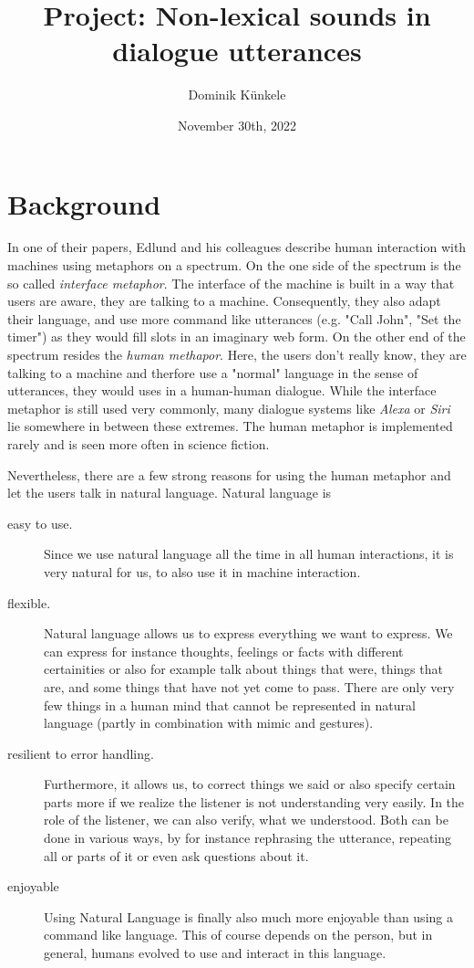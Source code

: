 \documentclass[
	11pt, %
]{fphw}
\title{Project: Non-lexical sounds in dialogue utterances} %
\date{November 30th, 2022} %
\author{Dominik Künkele}
\institute{University of Gothenburg} %
\begin{document}
\maketitle %


\section*{Background}
In one of their papers, Edlund and his colleagues describe human interaction with machines using metaphors on a spectrum. On the one side of the spectrum is the so called \emph{interface metaphor}. The interface of the machine is built in a way that users are aware, they are talking to a machine. Consequently, they also adapt their language, and use more command like utterances (e.g. "Call John", "Set the timer") as they would fill slots in an imaginary web form. On the other end of the spectrum resides the \emph{human methapor}. Here, the users don't really know, they are talking to a machine and therfore use a "normal" language in the sense of utterances, they would uses in a human-human dialogue. While the interface metaphor is still used very commonly, many dialogue systems like \emph{Alexa} or \emph{Siri} lie somewhere in between these extremes. The human metaphor is implemented rarely and is seen more often in science fiction.

Nevertheless, there are a few strong reasons for using the human metaphor and let the users talk in natural language. Natural language is
\begin{description}
    \item[easy to use.] Since we use natural language all the time in all human interactions, it is very natural for us, to also use it in machine interaction.
    \item[flexible.] Natural language allows us to express everything we want to express. We can express for instance thoughts, feelings or facts with different certainities or also for example talk about things that were, things that are, and some things that have not yet come to pass. There are only very few things in a human mind that cannot be represented in natural language (partly in combination with mimic and gestures).
    \item[resilient to error handling.] Furthermore, it allows us, to correct things we said or also specify certain parts more if we realize the listener is not understanding very easily. In the role of the listener, we can also verify, what we understood. Both can be done in various ways, by for instance rephrasing the utterance, repeating all or parts of it or even ask questions about it.
    \item[enjoyable] Using Natural Language is finally also much more enjoyable than using a command like language. This of course depends on the person, but in general, humans evolved to use and interact in this language.
\end{description}
\end{document}
